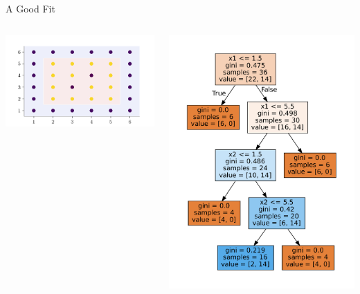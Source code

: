 \documentclass{beamer}
\begin{document}
\begin{frame}{A Good Fit}
\begin{columns}
\begin{column}{0.5\textwidth}
\includegraphics[width=\textwidth]{../figures/decision-trees/bias-variance-good-fit.pdf}
\end{column}
\begin{column}{0.5\textwidth}
\includegraphics[width =\textwidth]{../figures/decision-trees/bias-variance-good-fit-sklearn.pdf}
\end{column}
\end{columns}

\end{frame}
\end{document}
